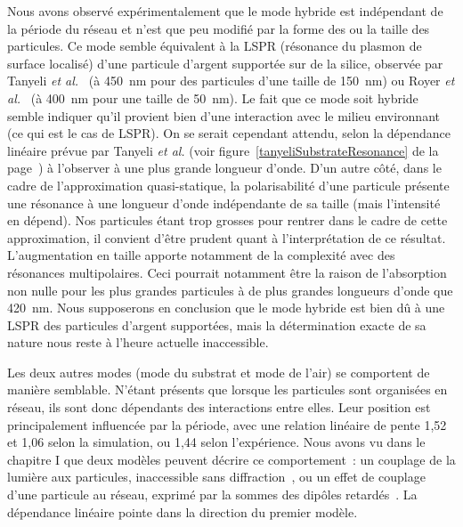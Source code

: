Nous avons observé expérimentalement que le mode hybride est indépendant de la période du réseau et n'est que peu modifié par la forme des ou la taille des particules. Ce mode semble équivalent à la LSPR (résonance du plasmon de surface localisé) d'une particule d'argent supportée sur de la silice, observée par Tanyeli \textit{et al.}~\cite{tanyeli2013effect} (à 450~nm pour des particules d'une taille de 150~nm) ou Royer \textit{et al.}~\cite{royer1987substrate} (à 400~nm pour une taille de 50~nm). Le fait que ce mode soit hybride semble indiquer qu'il provient bien d'une interaction avec le milieu environnant (ce qui est le cas de LSPR). On se serait cependant attendu, selon la dépendance linéaire prévue par Tanyeli \textit{et al.} (voir figure~\ref{tanyeliSubstrateResonance} de la page~\pageref{tanyeliSubstrateResonance}) à l'observer à une plus grande longueur d'onde. D'un autre côté, dans le cadre de l'approximation quasi-statique, la polarisabilité d'une particule présente une résonance à une longueur d'onde indépendante de sa taille (mais l'intensité en dépend). Nos particules étant trop grosses pour rentrer dans le cadre de cette approximation, il convient d'être prudent quant à l'interprétation de ce résultat. L'augmentation en taille apporte notamment de la complexité avec des résonances multipolaires. Ceci pourrait notamment être la raison de l'absorption non nulle pour les plus grandes particules à de plus grandes longueurs d'onde que 420~nm. Nous supposerons en conclusion que le mode hybride est bien dû à une LSPR des particules d'argent supportées, mais la détermination exacte de sa nature nous reste à l'heure actuelle inaccessible.\par 
Les deux autres modes (mode du substrat et mode de l'air) se comportent de manière semblable. N'étant présents que lorsque les particules sont organisées en réseau, ils sont donc dépendants des interactions entre elles. Leur position est principalement influencée par la période, avec une relation linéaire de pente 1,52 et 1,06 selon la simulation, ou 1,44 selon l'expérience. 
Nous avons vu dans le chapitre I que deux modèles peuvent décrire ce comportement~: un couplage de la lumière aux particules, inaccessible sans diffraction~\cite{kravets2008extremely}, ou un effet de couplage d’une particule au réseau, exprimé par la sommes des dipôles retardés~\cite{zou2004narrow}. La dépendance linéaire pointe dans la direction du premier modèle.\par 
